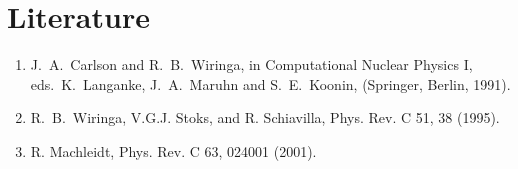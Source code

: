 \section*{Literature}
\begin{enumerate}
\item J.~A.~Carlson and R.~B.~Wiringa, in Computational Nuclear Physics I,
eds.~K.~Langanke, J.~A.~Maruhn and S.~E.~Koonin, (Springer, Berlin, 1991).
\item R.~B.~Wiringa, V.G.J. Stoks, and R. Schiavilla, Phys. Rev. C 51,
38 (1995).
\item R. Machleidt, Phys. Rev. C 63, 024001 (2001).
\end{enumerate}


